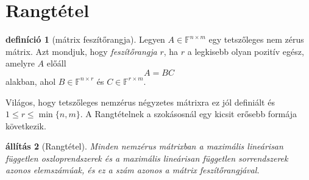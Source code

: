 \documentclass[a4paper, showtrims]{memoir}
\theoremstyle{plain}
\newtheorem{proposition}{állítás}[chapter]
\theoremstyle{remark}
\theoremstyle{definition}
\newtheorem{definition}[proposition]{definíció}
\begin{document}
\section{Rangtétel}
\begin{definition}[mátrix feszítőrangja]
	Legyen $A\in\mathbb{F}^{n\times m}$ egy tetszőleges nem zérus mátrix.
    Azt mondjuk, hogy \emph{feszítőrangja} $r$, ha $r$ a legkisebb olyan pozitív egész, amelyre $A$ előáll
	\[
		A=BC
	\]
	alakban, ahol $B\in\mathbb{F}^{n\times r}$ és $C\in\mathbb{F}^{r\times m}$.
\end{definition}
Világos, hogy tetszőleges nemzérus négyzetes mátrixra ez jól definiált és $1\leq r \leq \min\{n,m\}$.
A Rangtételnek a szokásosnál egy kicsit erősebb formája következik.

\begin{proposition}[Rangtétel]
	Minden nemzérus mátrixban
	a maximális lineárisan független oszloprendszerek
	és a max\-i\-má\-lis lineárisan független sorrendszerek azonos elemszámúak,
	és ez a szám azonos a mátrix feszítőrangjával.
    \label{pr:rang}
\end{proposition}
\end{document}
